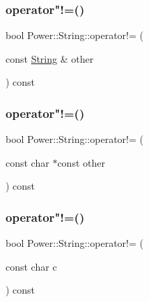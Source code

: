 \subsubsection{\texorpdfstring{operator"!=()}{operator!=()}\hspace{0.1cm}{\footnotesize\ttfamily [1/3]}}
{\footnotesize\ttfamily bool Power\+::\+String\+::operator!= (\begin{DoxyParamCaption}\item[{const \hyperlink{class_power_1_1_string}{String} \&}]{other }\end{DoxyParamCaption}) const\hspace{0.3cm}{\ttfamily [inline]}}

\mbox{\label{class_power_1_1_string_a267b8f261bcafb9ec6d86cfe12494c94}} 
\subsubsection{\texorpdfstring{operator"!=()}{operator!=()}\hspace{0.1cm}{\footnotesize\ttfamily [2/3]}}
{\footnotesize\ttfamily bool Power\+::\+String\+::operator!= (\begin{DoxyParamCaption}\item[{const char $\ast$const}]{other }\end{DoxyParamCaption}) const\hspace{0.3cm}{\ttfamily [inline]}}

\mbox{\label{class_power_1_1_string_a3216ffa5d292b08997d1c93d3c33251e}} 
\subsubsection{\texorpdfstring{operator"!=()}{operator!=()}\hspace{0.1cm}{\footnotesize\ttfamily [3/3]}}
{\footnotesize\ttfamily bool Power\+::\+String\+::operator!= (\begin{DoxyParamCaption}\item[{const char}]{c }\end{DoxyParamCaption}) const\hspace{0.3cm}{\ttfamily [inline]}}

